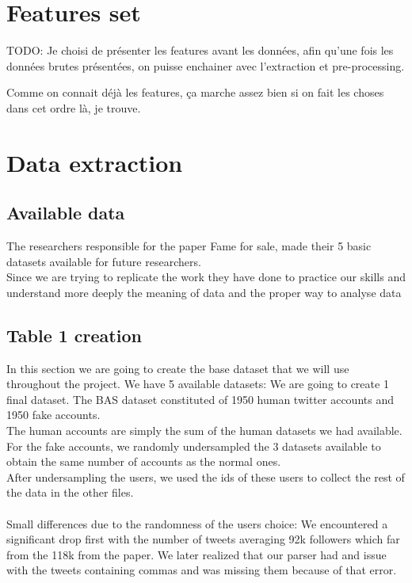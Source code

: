 \documentclass[a4paper,11pt]{article}
\begin{document}
\section{Features set}
TODO:
Je choisi de présenter les features avant les données, afin qu'une fois les données brutes présentées, on puisse enchainer avec l'extraction et pre-processing.

Comme on connait déjà les features, ça marche assez bien si on fait les choses dans cet ordre là, je trouve.

\section{Data extraction}

\subsection{Available data}
The researchers responsible for the paper Fame for sale, made their 5 basic datasets available for future researchers.\\ Since we are trying to replicate the work they have done to practice our skills and understand more deeply the meaning of data and the proper way to analyse data
\subsection{Table 1 creation}
In this section we are going to create the base dataset that we will use throughout the project.
We have 5 available datasets: 
We are going to create 1 final dataset. The BAS dataset constituted of 1950 human twitter accounts and 1950 fake accounts.\\ The human accounts are simply the sum of the human datasets we had available.\\
For the fake accounts, we randomly undersampled the 3 datasets available to obtain the same number of accounts as the normal ones.\\
After undersampling the users, we used the ids of these users to collect the rest of the data in the other files.\\\\
Small differences due to the randomness of the users choice:
We encountered a significant drop first with the number of tweets averaging 92k followers which far from the 118k from the paper. We later realized that our parser had and issue with the tweets containing commas and was missing them because of that error.\\
\end{document}
